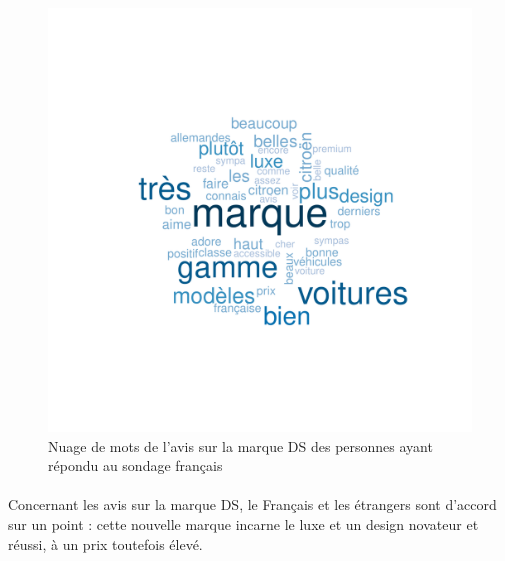 \documentclass[12pt]{article}\usepackage[]{graphicx}\usepackage[]{color}
\makeatletter
\def\maxwidth{ %
  \ifdim\Gin@nat@width>\linewidth
    \linewidth
  \else
    \Gin@nat@width
  \fi
}
\newenvironment{knitrout}{}{} %
\makeatother
\begin{document}
\begin{knitrout}
\color{fgcolor}\begin{figure}[H]
\includegraphics[width=\maxwidth]{figure/brand_fr-1} \caption[Nuage de mots de l'avis sur la marque DS des personnes ayant répondu au sondage français]{Nuage de mots de l'avis sur la marque DS des personnes ayant répondu au sondage français}\label{fig:brand fr}
\end{figure}


\end{knitrout}

%
%

\paragraph{} Concernant les avis sur la marque DS, le Français et les étrangers
sont d'accord sur un point : cette nouvelle marque incarne le luxe et un
design novateur et réussi, à un prix toutefois élevé.
\end{document}
